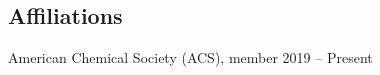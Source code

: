 \documentclass[margin,line]{resumecls}
\begin{document}
\begin{resume}

\vspace{1mm}
    \section{\mysidestyle Affiliations}

    American Chemical Society (ACS), member 2019 -- Present

\end{resume}
\end{document}
